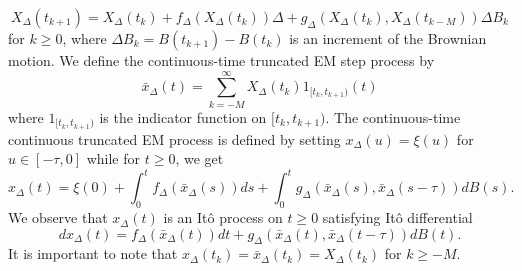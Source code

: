 \documentclass[11pt]{article}
\begin{document}
\begin{equation}\label{eq:27}
X_{\Delta}(t_{k+1})=X_{\Delta}(t_k)+f_{\Delta}(X_{\Delta}(t_k))\Delta+g_{\Delta}(X_{\Delta}(t_{k}),X_{\Delta}(t_{k-M}))\Delta B_k
\end{equation}
for $k\ge 0$, where $\Delta B_k=B(t_{k+1})-B(t_k)$ is an increment of the Brownian motion. We define the continuous-time truncated EM step process by
\begin{equation}\label{TEM1}
\bar{x}_{\Delta}(t)=\sum_{k=-M}^{\infty}X_{\Delta}(t_k)1_{[t_k,t_{k+1})}(t)
\end{equation}
where $1_{[t_k,t_{k+1})}$ is the indicator function on $[t_k,t_{k+1})$.  The  continuous-time continuous truncated EM process is defined by setting $x_{\Delta}(u)=\xi(u)$ for $u\in [-\tau,0]$ while for $t\geq 0$, we get
\begin{equation}\label{TEM2}
x_{\Delta}(t)=\xi(0)+\int_0^t f_{\Delta}(\bar{x}_{\Delta}(s))ds+\int_0^t g_{\Delta}(\bar{x}_{\Delta}(s),\bar{x}_{\Delta}(s-\tau))dB(s).
\end{equation}
We observe that $x_{\Delta}(t)$ is an It\^{o} process on $t\geq 0$ satisfying It\^{o} differential
\begin{equation}\label{eq:30}
dx_{\Delta}(t)= f_{\Delta}(\bar{x}_{\Delta}(t))dt+g_{\Delta}(\bar{x}_{\Delta}(t),\bar{x}_{\Delta}(t-\tau))dB(t).
\end{equation}
It is important to note that $x_{\Delta}(t_{k})=\bar{x}_{\Delta}(t_k)=X_{\Delta}(t_k)$ for $k\ge -M$.
\end{document}
